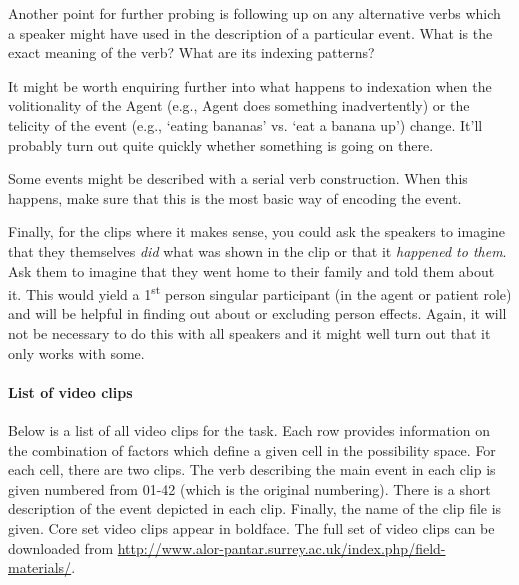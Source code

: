   Another point for further probing is following up on any alternative verbs which a speaker might have used in the description of a particular event. What is the exact meaning of the verb? What are its indexing patterns?

  It might be worth enquiring further into what happens to indexation when the volitionality of the Agent (e.g., Agent does something inadvertently) or the telicity of the event (e.g., `eating bananas' vs. `eat a banana up') change. It'll probably turn out quite quickly whether something is going on there.

  Some events might be described with a serial verb construction. When this happens, make sure that this is the most basic way of encoding the event. 

  Finally, for the clips where it makes sense, you could ask the speakers to imagine that they themselves \textit{did} what was shown in the clip or that it \textit{happened to them}. Ask them to imagine that they went home to their family and told them about it. This would yield a 1\textsuperscript{st} person singular participant (in the agent or patient role) and will be helpful in finding out about or excluding person effects. Again, it will not be necessary to do this with all speakers and it might well turn out that it only works with some.

\paragraph{List of video clips}

Below is a list of all video clips for the task. Each row provides information on the combination of factors which define a given cell in the possibility space. For each cell, there are two clips. The verb describing the main event in each clip is given numbered from 01-42 (which is the original numbering). There is a short description of the event depicted in each clip. Finally, the name of the clip file is given. Core set video clips appear in boldface. The full set of video clips can be downloaded from \url{http://www.alor-pantar.surrey.ac.uk/index.php/field-materials/}.\enlargethispage{4em}




